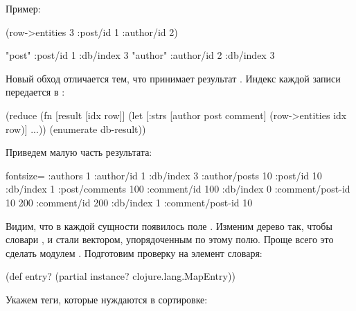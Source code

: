 Пример:

\begin{english}
  \begin{clojure}
(row->entities 3 {:post/id 1 :author/id 2})

{"post" {:post/id 1 :db/index 3}
 "author" {:author/id 2 :db/index 3}}
  \end{clojure}
\end{english}


Новый обход отличается тем, что  принимает результат . Индекс каждой записи передается в :

\begin{english}
  \begin{clojure}
(reduce
 (fn [result [idx row]]
   (let [{:strs [author post comment]}
         (row->entities idx row)]
     ...))
 {}
 (enumerate db-result))
  \end{clojure}
\end{english}

Приведем малую часть результата:

\begin{english}
  \begin{clojure*}{fontsize=\small}
{:authors
 {1 {:author/id 1
     :db/index 3
     :author/posts
     {10 {:post/id 10
          :db/index 1
          :post/comments
          {100 {:comment/id 100
                :db/index 0
                :comment/post-id 10}
           200 {:comment/id 200
                :db/index 1
                :comment/post-id 10}}}}}}}
  \end{clojure*}
\end{english}

Видим, что в каждой сущности появилось поле . Изменим дерево так, чтобы словари ,  и  стали вектором, упорядоченным по этому полю. Проще всего это сделать модулем . Подготовим проверку на элемент словаря:

\begin{english}
  \begin{clojure}
(def entry?
  (partial instance? clojure.lang.MapEntry))
  \end{clojure}
\end{english}

Укажем теги, которые нуждаются в сортировке:

